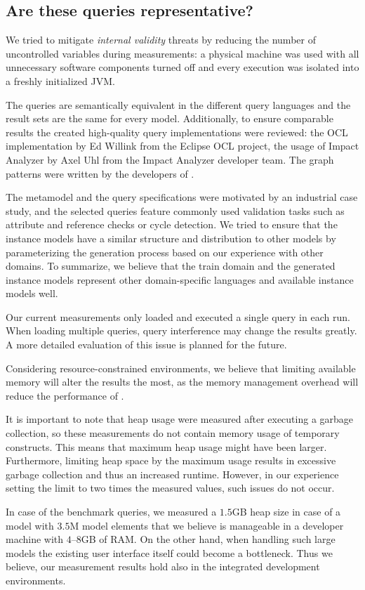 \subsection{Are these queries representative?}


We tried to mitigate \emph{internal validity} threats by reducing the number of
uncontrolled variables during measurements: a physical machine was used with all
unnecessary software components turned off and every execution was isolated into
a freshly initialized JVM.

The queries are semantically equivalent in the different query languages and the
result sets are the same for every model. Additionally, to ensure comparable
results the created high-quality query implementations were reviewed: the OCL
implementation by Ed Willink from the Eclipse OCL project, the usage of Impact
Analyzer by Axel Uhl from the Impact Analyzer developer team. The graph patterns
were written by the developers of \incquery{}.

The metamodel and the query specifications were motivated by an industrial case
study, and the selected queries feature commonly used validation tasks such as
attribute and reference checks or cycle detection. We tried to ensure that the
instance models have a similar structure and distribution to other models by
parameterizing the generation process based on our experience with other
domains. To summarize, we believe that the train domain and the generated
instance models represent other domain-specific languages and available instance
models well.

Our current measurements only loaded and executed a single query in each run.
When loading multiple queries, query interference may change the results
greatly. A more detailed evaluation of this issue is planned for the future.

Considering resource-constrained environments, we believe that limiting
available memory will alter the results the most, as the memory management
overhead will reduce the performance of \incquery{}.

It is important to note that heap usage were measured after executing a garbage
collection, so these measurements do not contain memory usage of temporary
constructs. This means that maximum heap usage might have been larger. Furthermore,
limiting heap space by the maximum usage results in excessive garbage collection
and thus an increased runtime. However, in our experience setting the limit to
two times the measured values, such issues do not occur.

In case of the benchmark queries, we measured a $1.5$GB heap size in case of a
model with $3.5$M model elements that we believe is manageable in a developer
machine with $4$--$8$GB of RAM. On the other hand, when handling such large
models the existing user interface itself could become a bottleneck. Thus we
believe, our measurement results hold also in the integrated development
environments.